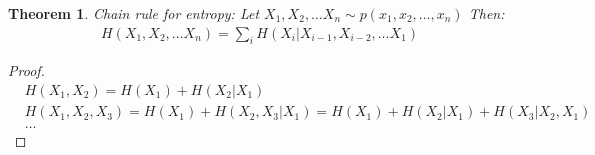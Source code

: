\documentclass[11pt]{book}
\newtheorem{theorem}{Theorem}
\renewcommand{\H}{\ensuremath{H}}
\begin{document}
\begin{theorem}
    Chain rule for entropy: Let $X_1, X_2, \dots X_n \sim p(x_1, x_2, \dots, x_n)$
    Then:
    \begin{align*}
        \H(X_1, X_2, \dots X_n) = \sum_i \H(X_i | X_{i-1}, X_{i-2}, \dots X_1)
    \end{align*}
\end{theorem}
\begin{proof}
    \begin{align*}
    &\H(X_1, X_2) = \H(X_1) + \H(X_2 | X_1) \\
    &\H(X_1, X_2, X_3) = \H(X_1) + \H(X_2, X_3 | X_1) = \H(X_1) + H(X_2 | X_1) + H(X_3 | X_2, X_1) \\
    &\dots
    \end{align*}
\end{proof}
\end{document}
